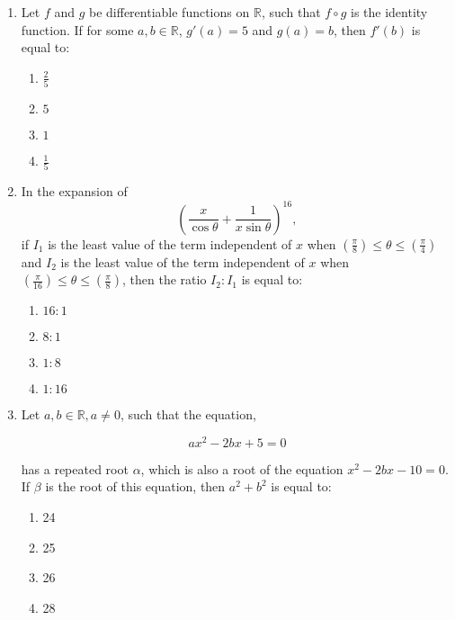 \documentclass[journal]{IEEEtran}
\numberwithin{equation}{enumi}
\numberwithin{figure}{enumi}
\begin{document}
\begin{enumerate}
    \item Let \( f \) and \( g \) be differentiable functions on \( \mathbb{R} \), such that \( f \circ g \) is the identity function. If for some \( a, b \in \mathbb{R} \), \( g'(a) = 5 \) and \( g(a) = b \), then \( f'(b) \) is equal to:
        \begin{multicols}{4}
        \begin{enumerate}
            \item \( \frac{2}{5} \)  
            \item \( 5 \)  
            \item \( 1 \)  
            \item \( \frac{1}{5} \)
        \end{enumerate}
        \end{multicols}

    \item In the expansion of 
    \[
    \left( \frac{x}{\cos \theta} + \frac{1}{x \sin \theta} \right)^{16},
    \]
    if \( I_1 \) is the least value of the term independent of \( x \) when \( \left( \frac{\pi}{8} \right) \leq \theta \leq \left( \frac{\pi}{4} \right) \) and \( I_2 \) is the least value of the term independent of \( x \) when \( \left( \frac{\pi}{16} \right) \leq \theta \leq \left( \frac{\pi}{8} \right) \), then the ratio \( I_2 : I_1 \) is equal to:
        \begin{multicols}{4}
        \begin{enumerate}
            \item \( 16:1 \)  
            \item \( 8:1 \)  
            \item \( 1:8 \)  
            \item \( 1:16 \)
        \end{enumerate}
        \end{multicols}
        
    \item Let $a,b\in\mathbb{R}, a\neq0$, such that the equation,

        \[ax^2-2bx+5=0\]
        
        has a repeated root $\alpha$, which is also a root of the equation $x^2-2bx-10=0$. If $\beta$ is the root of this equation, then $a^2+b^2$ is equal to:
        
        \begin{enumerate}
        \item 24
        \item 25
        \item 26
        \item 28
        \end{enumerate}
           

\end{enumerate}
\end{document}
